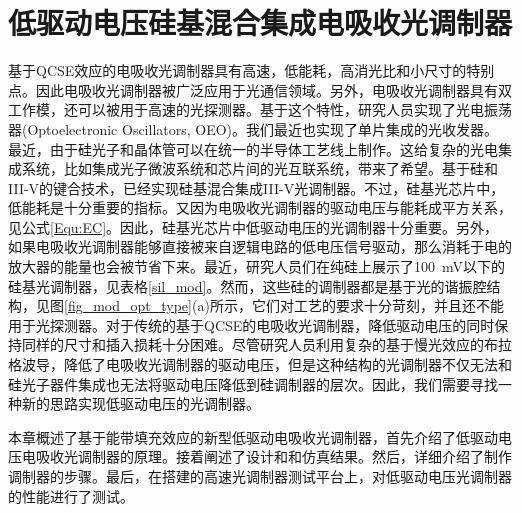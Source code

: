 \chapter{低驱动电压硅基混合集成电吸收光调制器}
基于QCSE效应的电吸收光调制器具有高速，低能耗，高消光比和小尺寸的特别点\cite{tang2012energy, fukano2006very}。因此电吸收光调制器被广泛应用于光通信领域。另外，电吸收光调制器具有双工作模，还可以被用于高速的光探测器\cite{welstand1996dual}。基于这个特性，研究人员实现了光电振荡器(Optoelectronic Oscillators, OEO)\cite{zhou2014compact}。我们最近也实现了单片集成的光收发器\cite{chen2016wavelength}。最近，由于硅光子和晶体管可以在统一的半导体工艺线上制作。这给复杂的光电集成系统，比如集成光子微波系统\cite{Marpaung2013integrated}和芯片间的光互联系统\cite{sun2015single}，带来了希望。基于硅和III-V的键合技术，已经实现硅基混合集成III-V光调制器\cite{kuo2008high,tang201150,tang2012over,tang2012energy,chen2011forty,Srinivasan2012micro,fu20155}。不过，硅基光芯片中，低能耗是十分重要的指标。又因为电吸收光调制器的驱动电压与能耗成平方关系，见公式\ref{Equ:EC}。因此，硅基光芯片中低驱动电压的光调制器十分重要。另外，如果电吸收光调制器能够直接被来自逻辑电路的低电压信号驱动，那么消耗于电的放大器的能量也会被节省下来。最近，研究人员们在纯硅上展示了100~mV以下的硅基光调制器，见表格\ref{sil_mod}。然而，这些硅的调制器都是基于光的谐振腔结构，见图\ref{fig_mod_opt_type}(a)所示，它们对工艺的要求十分苛刻，并且还不能用于光探测器。对于传统的基于QCSE的电吸收光调制器，降低驱动电压的同时保持同样的尺寸和插入损耗十分困难。尽管研究人员利用复杂的基于慢光效应的布拉格波导\cite{gulow-voltage2013}，降低了电吸收光调制器的驱动电压，但是这种结构的光调制器不仅无法和硅光子器件集成也无法将驱动电压降低到硅调制器的层次。因此，我们需要寻找一种新的思路实现低驱动电压的光调制器。

本章概述了基于能带填充效应的新型低驱动电吸收光调制器，首先介绍了低驱动电压电吸收光调制器的原理。接着阐述了设计和和仿真结果。然后，详细介绍了制作调制器的步骤。最后，在搭建的高速光调制器测试平台上，对低驱动电压光调制器的性能进行了测试。
